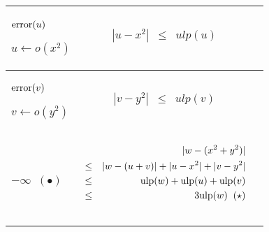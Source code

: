 \documentclass[12pt]{amsart}
\def\ulp{{\rm ulp}}
\begin{document}
\begin{center}
\begin{tabular}{l|l |l}

\begin{minipage}{2.5cm}


${\textnormal{error}}(u)$


$u \leftarrow o(x^2)$

\end{minipage} &
\begin{minipage}{7.5cm}

\begin{eqnarray}\nonumber
  |u-x^2| &\leq& ulp(u)\\\nonumber
\end{eqnarray}

\end{minipage} &
\begin{minipage}{6cm}
{\hspace{7cm}}
\end{minipage}\\\hline
\begin{minipage}{2.5cm}
${\textnormal{error}}(v)$


$v \leftarrow o({y}^{2}) $

\end{minipage} &
\begin{minipage}{7.5cm}

\begin{eqnarray}\nonumber
  |v-y^2| &\leq& ulp(v)\\\nonumber
\end{eqnarray}


\end{minipage} &
\begin{minipage}{6cm}


\end{minipage}\\\hline
\begin{minipage}{2.5cm}
${\textnormal{error}}(w)$


$w \leftarrow o(u+v) $\\
$-\infty \;\; (\bullet)$
\end{minipage} &
\begin{minipage}{7.8cm}



\begin{eqnarray}\nonumber
  &&|w-(x^2+y^2)| \\\nonumber
  &       \leq&  |w - (u+v)|+|u - x^2|+|v - y^2|\\\nonumber
  &       \leq& \ulp(w) + \ulp(u) + \ulp(v)\\\nonumber
  &       \leq& 3\ulp(w)\;\;(\star)\\\nonumber
\end{eqnarray}



\end{minipage}
\end{tabular}
\end{center}
\end{document}
